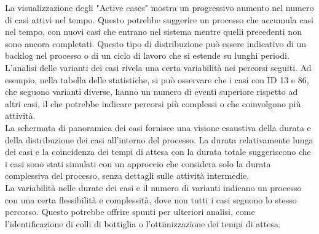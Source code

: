 \documentclass{article}
\begin{document}
La visualizzazione degli "Active cases" mostra un progressivo aumento nel numero di casi attivi nel tempo. Questo potrebbe suggerire un processo che accumula casi nel tempo, con nuovi casi che entrano nel sistema mentre quelli precedenti non sono ancora completati. Questo tipo di distribuzione può essere indicativo di un backlog nel processo o di un ciclo di lavoro che si estende su lunghi periodi.\\
L'analisi delle varianti dei casi rivela una certa variabilità nei percorsi seguiti. Ad esempio, nella tabella delle statistiche, si può osservare che i casi con ID 13 e 86, che seguono varianti diverse, hanno un numero di eventi superiore rispetto ad altri casi, il che potrebbe indicare percorsi più complessi o che coinvolgono più attività.\\
La schermata di panoramica dei casi fornisce una visione esaustiva della durata e della distribuzione dei casi all'interno del processo. La durata relativamente lunga dei casi e la coincidenza dei tempi di attesa con la durata totale suggeriscono che i casi sono stati simulati con un approccio che considera solo la durata complessiva del processo, senza dettagli sulle attività intermedie.\\
La variabilità nelle durate dei casi e il numero di varianti indicano un processo con una certa flessibilità e complessità, dove non tutti i casi seguono lo stesso percorso. Questo potrebbe offrire spunti per ulteriori analisi, come l'identificazione di colli di bottiglia o l'ottimizzazione dei tempi di attesa.
\end{document}
